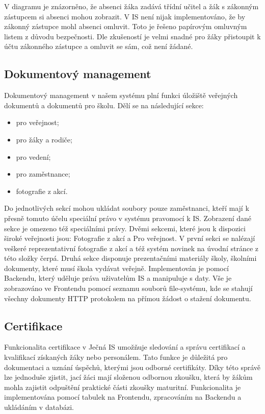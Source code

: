 \documentclass[FM,Proj]{tulthesis}
\begin{document}
V diagramu je znázorněno, že absenci žáka zadává třídní učitel a žák s zákonným zástupcem
si absenci mohou zobrazit. V IS není nijak implementováno, že by zákonný zástupce mohl
absenci omluvit. Toto je řešeno papírovým omluvným listem z důvodu bezpečnosti. Dle zkušeností
je velmi snadné pro žáky přistoupit k účtu zákonného zástupce a omluvit se sám, což není žádané.

\subsection*{Dokumentový management}
Dokumentový management v našem systému plní funkci úložiště veřejných dokumentů
a dokumentů pro školu. Dělí se na následující sekce:
\begin{itemize}
    \item pro veřejnost;
    \item pro žáky a rodiče;
    \item pro vedení;
    \item pro zaměstnance;
    \item fotografie z akcí.
\end{itemize}
Do jednotlivých sekcí mohou ukládat soubory pouze zaměstnanci, kteří mají k
přesně tomuto účelu speciální právo v systému pravomocí k IS. Zobrazení dané 
sekce je omezeno též speciálními právy. Dvěmi sekcemi, které jsou k dispozici
široké veřejnosti jsou: Fotografie z akcí a Pro veřejnost. V první sekci se
nalézají veškeré reprezentativní fotografie z akcí a též systém novinek na 
úvodní stránce z této složky čerpá. Druhá sekce disponuje prezentačními materiály
školy, školními dokumenty, které musí škola vydávat veřejně.
Implementován je pomocí Backendu, který uděluje práva uživatelům IS a manipuluje 
s daty. Vše je zobrazováno ve Frontendu pomocí seznamu souborů file-systému, kde
se stahují všechny dokumenty HTTP protokolem na přímou žádost o stažení dokumentu.

\subsection*{Certifikace}
Funkcionalita certifikace v Ječná IS umožňuje sledování a správu 
certifikací a kvalifikací získaných žáky nebo personálem. Tato funkce je důležitá
pro dokumentaci a uznání úspěchů, kterými jsou odborné certifikáty. Díky této 
správě lze jednoduše zjistit, jací žáci mají složenou odbornou zkoušku, 
která by žákům mohla zajistit odpuštění praktické části zkoušky maturitní.
Funkcionalita je implementována pomocí tabulek na Frontendu, zpracováním na Backendu
a ukládáním v databázi.
\end{document}
